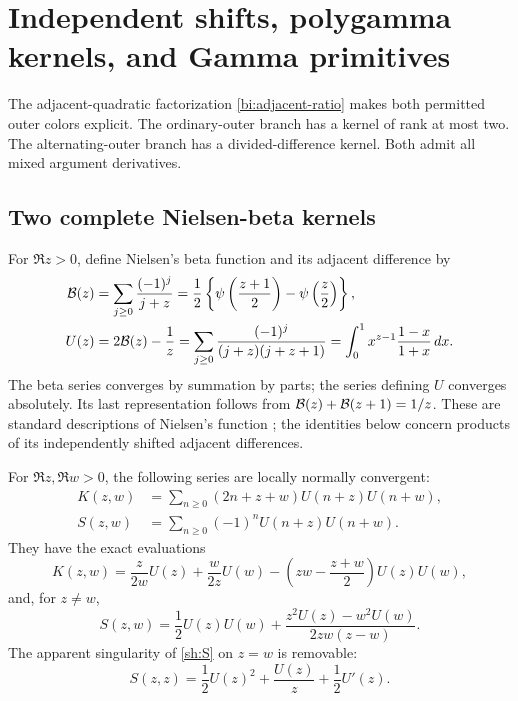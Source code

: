 \section{Independent shifts, polygamma kernels, and Gamma primitives}
\label{sec:shifted}

The adjacent-quadratic factorization \eqref{bi:adjacent-ratio} makes
both permitted outer colors explicit. The ordinary-outer branch has
a kernel of rank at most two. The alternating-outer branch has a
divided-difference kernel. Both admit all mixed argument derivatives.

\subsection{Two complete Nielsen-beta kernels}

For $\Re z>0$, define Nielsen's beta function and its adjacent difference
by
\begin{align}
 \mathcal B(z)&=\sum_{j\ge0}\frac{(-1)^j}{j+z}
    =\frac12\left\{\psi\left(\frac{z+1}{2}\right)
                           -\psi\left(\frac z2\right)\right\},
       \label{sh:beta}\\
 U(z)&=2\mathcal B(z)-\frac1z
     =\sum_{j\ge0}\frac{(-1)^j}{(j+z)(j+z+1)}
     =\int_0^1 x^{z-1}\frac{1-x}{1+x}\,dx.
       \label{sh:U}
\end{align}
The beta series converges by summation by parts; the series defining
$U$ converges absolutely. Its last representation follows from
$\mathcal B(z)+\mathcal B(z+1)=1/z$. These are standard descriptions of
Nielsen's function \cite{NielsenBeta}; the identities below concern
products of its independently shifted adjacent differences.

\begin{theorem}
\label{sh:two-kernels}
For $\Re z,\Re w>0$, the following series are locally normally
convergent:
\begin{align}
 K(z,w)&=\sum_{n\ge0}(2n+z+w)U(n+z)U(n+w),\label{sh:Kdef}\\
 S(z,w)&=\sum_{n\ge0}(-1)^nU(n+z)U(n+w).\label{sh:Sdef}
\end{align}
They have the exact evaluations
\begin{equation}\label{sh:K}
 \boxed{\displaystyle
 K(z,w)=\frac{z}{2w}U(z)+\frac{w}{2z}U(w)
                -\left(zw-\frac{z+w}{2}\right)U(z)U(w),}
\end{equation}
and, for $z\ne w$,
\begin{equation}\label{sh:S}
 \boxed{\displaystyle
 S(z,w)=\frac12U(z)U(w)
      +\frac{z^2U(z)-w^2U(w)}{2zw(z-w)}.}
\end{equation}
The apparent singularity of \eqref{sh:S} on $z=w$ is removable:
\begin{equation}\label{sh:Sdiagonal}
 S(z,z)=\frac12U(z)^2+\frac{U(z)}z+\frac12U'(z).
\end{equation}
\end{theorem}

